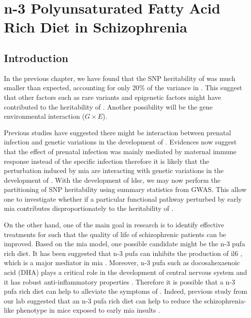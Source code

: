 \chapter{n-3 Polyunsaturated Fatty Acid Rich Diet in Schizophrenia}
\label{omegaProject}
\section{Introduction}
In the previous chapter, we have found that the \gls{SNP} heritability of  was much smaller than expected, accounting for only 20\% of the variance in .
This suggest that other factors such as rare variants and epigenetic factors might have contributed to the heritability of .
Another possibility will be the gene environmental interaction ($G\times E$).

Previous studies have suggested there might be interaction between prenatal infection and genetic variations in the development of  \citep{Tienari2004,Clarke2009}.
Evidences now suggest that the effect of prenatal infection was mainly mediated by maternal immune response instead of the specific infection \citep{Brown2010} therefore it is likely that the perturbation induced by \gls{mia} are interacting with genetic variations in the development of .
With the development of \gls{ldsc}, we may now perform the partitioning of \gls{SNP} heritability using summary statistics from \gls{GWAS}. 
This allow one to investigate whether if a particular functional pathway perturbed by early \gls{mia} contributes disproportionately to the heritability of .

On the other hand, one of the main goal in  research is to identify effective treatments for  such that the quality of life of schizophrenic patients can be improved. 
Based on the \gls{mia} model, one possible candidate might be the n-3 \gls{pufa} rich diet. 
It has been suggested that n-3 \gls{pufa} can inhibits the production of \gls{il6} \citep{Trebble2003}, which is a major mediator in \gls{mia} \citep{Smith2007}.
Moreover, n-3 \gls{pufa} such as docosahexaenoic acid (DHA) plays a critical role in the development of central nervous system \citep{Clandinin1999,Kitajka2002} and it has robust anti-inflammatory properties \citep{Trebble2003}.
Therefore it is possible that a n-3 \gls{pufa} rich diet can help to alleviate the symptoms of .
Indeed, previous study from our lab suggested that an n-3 \gls{pufa} rich diet can help to reduce the schizophrenia-like phenotype in mice exposed to early \gls{mia} insults \citep{Li2015}.

